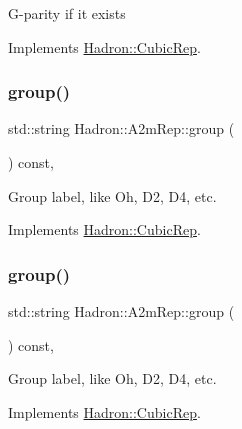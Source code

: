 G-\/parity if it exists 

Implements \mbox{\hyperlink{structHadron_1_1CubicRep_a52104e43266d1614c00bbd1c3b395458}{Hadron\+::\+Cubic\+Rep}}.

\mbox{\label{structHadron_1_1A2mRep_a8f8bcb50489cf3fc66831ffc0b3d02c3}} 
\subsubsection{\texorpdfstring{group()}{group()}\hspace{0.1cm}{\footnotesize\ttfamily [1/2]}}
{\footnotesize\ttfamily std\+::string Hadron\+::\+A2m\+Rep\+::group (\begin{DoxyParamCaption}{ }\end{DoxyParamCaption}) const\hspace{0.3cm}{\ttfamily [inline]}, {\ttfamily [virtual]}}

Group label, like Oh, D2, D4, etc. 

Implements \mbox{\hyperlink{structHadron_1_1CubicRep_a0748f11ec87f387062c8e8981339a29c}{Hadron\+::\+Cubic\+Rep}}.

\mbox{\label{structHadron_1_1A2mRep_a8f8bcb50489cf3fc66831ffc0b3d02c3}} 
\subsubsection{\texorpdfstring{group()}{group()}\hspace{0.1cm}{\footnotesize\ttfamily [2/2]}}
{\footnotesize\ttfamily std\+::string Hadron\+::\+A2m\+Rep\+::group (\begin{DoxyParamCaption}{ }\end{DoxyParamCaption}) const\hspace{0.3cm}{\ttfamily [inline]}, {\ttfamily [virtual]}}

Group label, like Oh, D2, D4, etc. 

Implements \mbox{\hyperlink{structHadron_1_1CubicRep_a0748f11ec87f387062c8e8981339a29c}{Hadron\+::\+Cubic\+Rep}}.

\mbox{\label{structHadron_1_1A2mRep_a1450e109b5a5fcb9a2098c67305fb5af}} 
